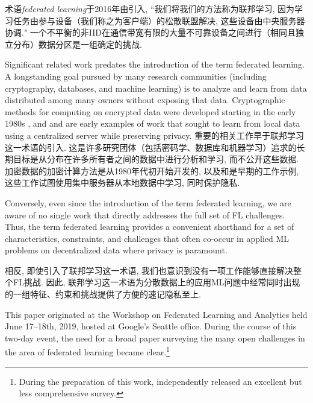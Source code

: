 术语\emph{federated learning}于2016年由\citet{mcmahan17fedavg}引入, ``我们将我们的方法称为联邦学习, 因为学习任务由参与设备（我们称之为客户端）的松散联盟解决, 这些设备由中央服务器协调." 一个不平衡的非IID在通信带宽有限的大量不可靠设备之间进行（相同且独立分布）数据分区是一组确定的挑战. 


Significant related work predates the introduction of the term federated learning. A longstanding goal pursued by many research communities (including cryptography, databases, and machine learning) is to analyze and learn from data distributed among many owners without exposing that data. Cryptographic methods for computing on encrypted data were developed starting in the early 1980s \citep{Rivest1978,yao1982protocols}, and \citet{agrawal2000} and \citet{vaidya2008ppsvm} are early examples of work that sought to learn from local data using a centralized server while preserving privacy.
%
重要的相关工作早于联邦学习这一术语的引入. 这是许多研究团体（包括密码学、数据库和机器学习）追求的长期目标是从分布在许多所有者之间的数据中进行分析和学习, 而不公开这些数据. 加密数据的加密计算方法是从1980年代初开始开发的\citep{Rivest1978,yao1982protocols}, 以及\citet{agrawal2000}和\citet{vaidya2008ppsvm}是早期的工作示例, 这些工作试图使用集中服务器从本地数据中学习, 同时保护隐私. 

Conversely, even since the introduction of the term federated learning, we are aware of no single work that directly addresses the full set of FL challenges. Thus, the term federated learning provides a convenient shorthand for a set of characteristics, constraints, and challenges that often co-occur in applied ML problems on decentralized data where privacy is paramount.

相反, 即使引入了联邦学习这一术语, 我们也意识到没有一项工作能够直接解决整个FL挑战. 因此, 联邦学习这一术语为分散数据上的应用ML问题中经常同时出现的一组特征、约束和挑战提供了方便的速记隐私至上. 

This paper originated at the Workshop on Federated Learning and Analytics held June 17--18th, 2019, hosted at Google's Seattle office. During the course of this two-day event, the need for a broad paper surveying the many open challenges in the area of federated learning became clear.\footnote{During the preparation of this work, \citet{li2019federated} independently released an excellent but less comprehensive survey.}

